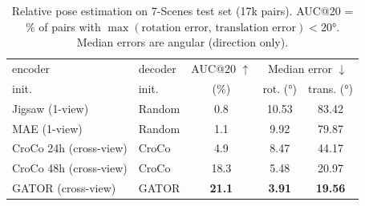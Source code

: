\documentclass{article}
\begin{document}
\begin{table}[ht]
\centering
\renewcommand{\arraystretch}{1.3}
\begin{tabular}{ll c cc}
\toprule
encoder & decoder & AUC@20 $\uparrow$ & \multicolumn{2}{c}{Median error $\downarrow$} \\
init. & init. & (\%) & rot. (°) & trans. (°) \\
\midrule
Jigsaw (1-view)       & Random         &  0.8 & 10.53 & 83.42 \\
MAE (1-view)          & Random         &  1.1 &  9.92 & 79.87 \\
CroCo 24h (cross-view) & CroCo        &  4.9 &  8.47 & 44.17 \\
CroCo 48h (cross-view) & CroCo        & 18.3 &  5.48 & 20.97 \\
{\color{green!50!black}GATOR (cross-view)} & {\color{green!50!black}GATOR} & \textbf{21.1} & \textbf{3.91} & \textbf{19.56} \\
\bottomrule
\end{tabular}
\caption{Relative pose estimation on 7-Scenes test set (17k pairs).
AUC@20 = \% of pairs with $\max(\text{rotation error},\, \text{translation error}) < 20°$.
Median errors are angular (direction only).}
\end{table}
\end{document}
